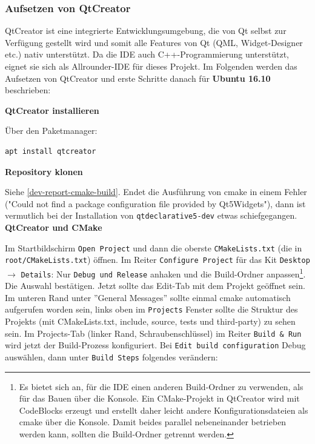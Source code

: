 
\subsubsection{Aufsetzen von QtCreator}

QtCreator ist eine integrierte Entwicklungsumgebung, die von Qt selbst zur
Verfügung gestellt wird und somit alle Features von Qt (QML, Widget-Designer
etc.) nativ unterstützt. Da die IDE auch C++-Programmierung unterstützt, eignet
sie sich als Allrounder-IDE für dieses Projekt. Im Folgenden werden das
Aufsetzen von QtCreator und erste Schritte danach für \textbf{Ubuntu 16.10}
beschrieben:

\textbf{QtCreator installieren}

Über den Paketmanager:
\begin{lstlisting}
apt install qtcreator
\end{lstlisting}

\textbf{Repository klonen}

Siehe \autoref{dev-report-cmake-build}. Endet die Ausführung von cmake in einem
Fehler ("Could not find a package configuration file provided by Qt5Widgets"),
dann ist vermutlich bei der Installation von \texttt{qtdeclarative5-dev} etwas
schiefgegangen.\\

\textbf{QtCreator und CMake}

Im Startbildschirm \texttt{Open Project} und dann die oberste
\texttt{CMakeLists.txt} (die in \texttt{root/CMakeLists.txt}) öffnen. Im Reiter
\texttt{Configure Project} für das Kit \texttt{Desktop} $\rightarrow$
\texttt{Details}: Nur \texttt{Debug und Release} anhaken und die Build-Ordner
anpassen\footnote{Es bietet sich an, für die IDE einen anderen Build-Ordner zu
verwenden, als für das Bauen über die Konsole. Ein CMake-Projekt in QtCreator
wird mit CodeBlocks erzeugt und erstellt daher leicht andere
Konfigurationsdateien als cmake über die Konsole. Damit beides parallel
nebeneinander betrieben werden kann, sollten die Build-Ordner getrennt werden.}.
Die Auswahl bestätigen. Jetzt sollte das Edit-Tab mit dem Projekt geöffnet sein.
Im unteren Rand unter ''General Messages'' sollte einmal cmake automatisch
aufgerufen worden sein, links oben im \texttt{Projects} Fenster sollte die
Struktur des Projekts (mit CMakeLists.txt, include, source, tests und
third-party) zu sehen sein. Im Projects-Tab (linker Rand, Schraubenschlüssel) im
Reiter \texttt{Build \& Run} wird jetzt der Build-Prozess konfiguriert. Bei
\texttt{Edit build configuration} Debug auswählen, dann unter \texttt{Build
Steps} folgendes verändern:

